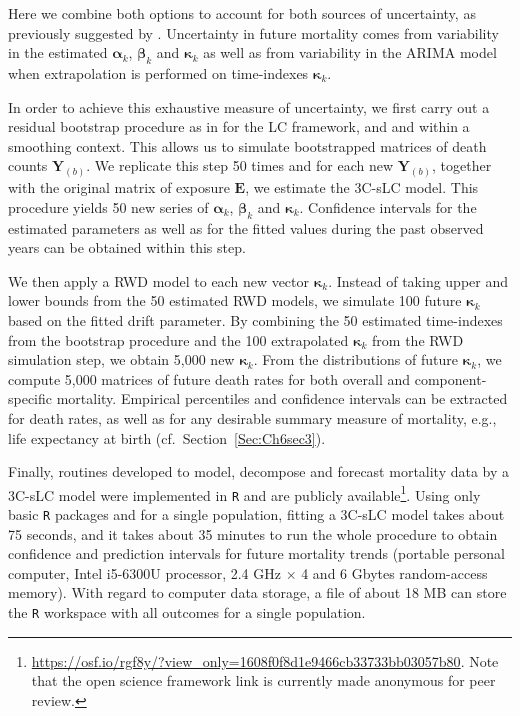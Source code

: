 \documentclass[Thesis]{subfiles}
\begin{document}
Here we combine both options to account for both sources of uncertainty, as previously suggested by \cite{keilman2006prediction}. Uncertainty in future mortality comes from variability in the estimated $\bm{\alpha}_{k}$, $\bm{\beta}_{k}$ and $\bm{\kappa}_{k}$ as well as from variability in the ARIMA model when extrapolation is performed on time-indexes $\bm{\kappa}_{k}$. 

In order to achieve this exhaustive measure of uncertainty, we first carry out a residual bootstrap procedure as in \citet{koissi2006evaluating} for the LC framework, and \citet{ouellette2012regional} and \citet{camarda2019smooth} within a smoothing context. This allows us to simulate bootstrapped matrices of death counts $\bm{Y}_{(b)}$. We replicate this step 50 times and for each new $\bm{Y}_{(b)}$, together with the original matrix of exposure $\bm{E}$, we estimate the 3C-sLC model. 
This procedure yields 50 new series of $\bm{\alpha}_{k}$, $\bm{\beta}_{k}$ and $\bm{\kappa}_{k}$. Confidence intervals for the estimated parameters as well as for the fitted values during the past observed years can be obtained within this step. 

We then apply a RWD model to each new vector $\bm{\kappa}_{k}$. Instead of taking upper and lower bounds from the 50 estimated RWD models, we simulate 100 future $\bm{\kappa}_{k}$ based on the fitted drift parameter. By combining the 50 estimated time-indexes from the bootstrap procedure and the 100 extrapolated  $\bm{\kappa}_{k}$ from the RWD simulation step, we obtain 5,000 new $\bm{\kappa}_{k}$. From the distributions of future $\bm{\kappa}_{k}$, we 
compute 5,000 matrices of future death rates for both overall and component-specific mortality. Empirical percentiles and confidence intervals can be extracted for death rates, as well as for any desirable summary measure of mortality, e.g., life expectancy at birth (cf.~Section~\ref{Sec:Ch6sec3}).

Finally, routines developed to model, decompose and forecast mortality data by a 3C-sLC model were implemented in \texttt{R} \citep{Rcite} and are publicly available\footnote{ \url{https://osf.io/rgf8y/?view_only=1608f0f8d1e9466cb33733bb03057b80}. Note that the open science framework link is currently made anonymous for peer review.}. Using only basic \texttt{R} packages and for a single population, fitting a 3C-sLC model takes about 75 seconds, and it takes about 35 minutes to run the whole procedure to obtain confidence and prediction intervals for future mortality trends (portable personal computer, Intel i5-6300U processor, 2.4 GHz $\times$ 4 and 6 Gbytes random-access memory). With regard to computer data storage, a file of about 18 MB can store the \texttt{R} workspace with all outcomes for a single population.
\end{document}
